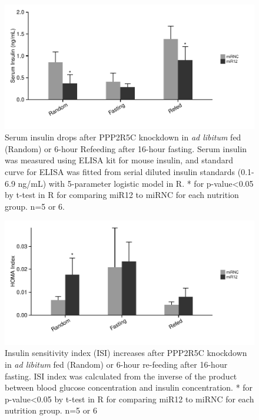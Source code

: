 \begin{figure}[htbp]
\centering
\includegraphics[width=1\textwidth]{figs/fig2-28 serum insulin.pdf}
\caption[Serum insulin drops after PPP2R5C KD]{\footnotesize Serum insulin drops after PPP2R5C knockdown in \textit{ad libitum} fed (Random) or 6-hour Refeeding after 16-hour fasting. Serum insulin was measured using ELISA kit for mouse insulin, and standard curve for ELISA was fitted from serial diluted insulin standards (0.1-6.9 ng/mL) with 5-parameter logistic model in R. * for p-value<0.05 by t-test in R for comparing miR12 to miRNC for each nutrition group. n=5 or 6.}
\label{fig:fig2.28}
\end{figure}


\begin{figure}[htbp]
\centering
\includegraphics[width=1\textwidth]{figs/fig2-29 homa index.pdf}
\caption[ISI index increases after PPP2R5C KD]{\footnotesize Insulin sensitivity index (ISI) increases after PPP2R5C knockdown in \textit{ad libitum} fed (Random) or 6-hour re-feeding after 16-hour fasting. ISI index was calculated from the inverse of the product between blood glucose concentration and insulin concentration. * for p-value<0.05 by t-test in R for comparing miR12 to miRNC for each nutrition group. n=5 or 6}
\label{fig:fig2.29}
\end{figure}


